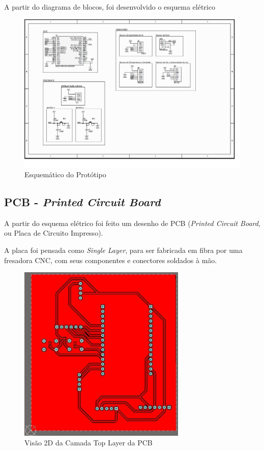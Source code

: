 \documentclass[../monografia.tex]{subfiles}
\begin{document}
A partir do diagrama de blocos, foi desenvolvido o esquema elétrico

\begin{figure}[h]
\includegraphics[width=\textwidth]{sch}
\caption{Esquemático do Protótipo}
\label{fig:img2}
\end{figure}

\subsection{PCB - \textit{Printed Circuit Board}}

A partir do esquema elétrico foi feito um desenho de PCB (\textit{Printed Circuit Board}, ou Placa de Circuito Impresso). 

A placa foi pensada como \textit{Single Layer}, para ser fabricada em fibra por uma fresadora CNC, com seus componentes e conectores soldados à mão. 



\begin{figure}[h!]
\centering
\includegraphics[width=8cm]{pcb_2}
\caption{Visão 2D da Camada Top Layer da PCB}
\label{fig:img3}
\end{figure}
\end{document}
